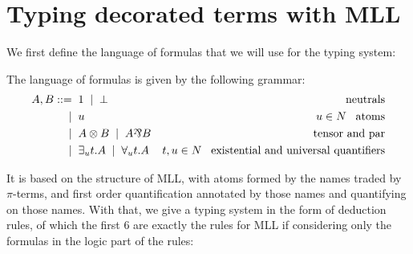 
\section{Typing decorated terms with MLL}

We first define the language of formulas that we will use for the typing system:
\begin{definition}
The language of formulas is given by the following grammar:
\begin{align*}
A,B::=	&\;\; 1 \;\; | \;\; \bot							& \text{neutrals}\\
	|	&\;\; u											& u\in N\;\;\;\text{atoms}\\
	|	&\;\; A \logtensor B \;\; | \;\; A \logpar B		& \text{tensor and par}\\
	|	&\;\; \exists_ut.A \;\; | \;\; \forall_ut.A		& t,u\in N\;\;\; \text{existential and universal quantifiers}
\end{align*}
\end{definition}

It is based on the structure of MLL, with atoms formed by the names traded by $\pi$-terms, and first order quantification annotated by those names and quantifying on those names. With that, we give a typing system in the form of deduction rules, of which the first 6 are exactly the rules for MLL if considering only the formulas in the logic part of the rules: 

